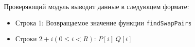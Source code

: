 Проверяющий модуль выводит данные в следующем формате:
\begin{itemize}
\item Строка 1: Возвращаемое значение функции \texttt{findSwapPairs}
\item Строки $2+i (0 \le i < R)$: $P[i]\ Q[i]$
\end{itemize}